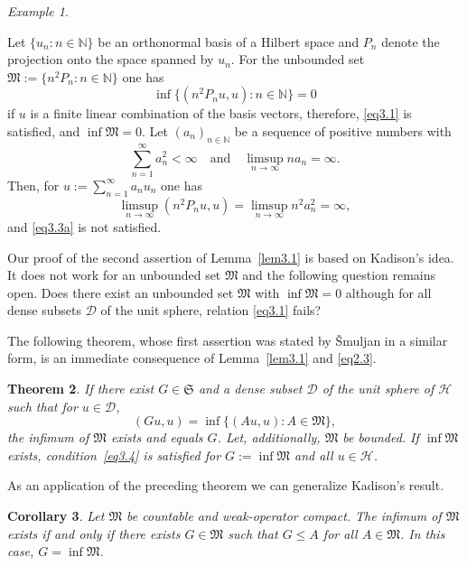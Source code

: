 \documentclass[12pt, a4paper, reqno, twoside]{amsart}
\numberwithin{equation}{section}
\newcommand{\frakS}{\mathfrak S}
\newcommand{\frakM}{\mathfrak M}
\newtheorem{theorem}{Theorem}[section]
\newtheorem{corollary}[theorem]{Corollary}
\theoremstyle{definition}
\theoremstyle{remark}
\newtheorem{example}[theorem]{Example}
\theoremstyle{mystyle}
\begin{document}
\begin{example}
\label{ex3.2}

Let $\{u_{n}: n\in\mathbb N\}$ be an orthonormal basis of a Hilbert
space and $P_{n}$ denote the projection onto the space spanned by
$u_{n}$. For the unbounded set $\frakM:=\{n^{2}P_{n} : n\in\mathbb
N\}$ one has
\[
  \inf\bigl\{(n^{2}P_{n}u,u) : n\in\mathbb N\bigr\}=0
\]
if $u$ is a finite linear combination of the basis vectors, therefore,
\eqref{eq3.1} is satisfied, and $\inf\frakM=0$. Let
$(a_{n})_{n\in\mathbb N}$  be a sequence of positive numbers with
\[
 \sum_{n=1}^{\infty}a_{n}^{2}<\infty \quad\text{and}\quad
 \limsup_{n\to\infty} na_{n} =\infty. 
\]
Then, for $u:=\sum_{n=1}^{\infty}a_{n}u_{n}$ one has
\[
\limsup_{n\to\infty}(n^{2} P_{n}u,u)=
\limsup_{n\to\infty}n^{2}a_{n}^{2} = \infty,
\]
and \eqref{eq3.3a} is not satisfied.
\end{example}

Our proof of the second assertion of Lemma~\ref{lem3.1} is based on
Kadison's idea. It does not work for an unbounded set $\frakM$ and the
following question remains open. Does there exist an unbounded set
$\frakM$ with $\inf\frakM=0$ although for all dense subsets $\mathscr
D$ of the unit sphere, relation \eqref{eq3.1} fails?

The following theorem, whose first assertion was stated by
{\v S}mul{\cprime}jan \cite[Thm. 1.2]{Shmulyan1959} in a similar form,
is an immediate consequence of Lemma~\ref{lem3.1} and \eqref{eq2.3}.

\begin{theorem}
  \label{thm3.3}
If there exist $G\in\frakS$ and a dense subset $\mathscr D$ of the
unit sphere of $\mathscr H$ such that for $u\in\mathscr D$,
\begin{equation}
  \label{eq3.4}
  (Gu,u)=\inf\bigl\{(Au,u) : A\in\frakM\bigr\},
\end{equation}
the infimum of $\frakM$ exists and equals $G$. Let, additionally,
$\frakM$ be bounded. If $\inf\frakM$ exists, condition~\eqref{eq3.4} is
satisfied for $G:=\inf\frakM$ and all $u\in\mathscr H$.
\end{theorem}

As an application of the preceding theorem we can generalize
Kadison's result.

\begin{corollary}
\label{cor3.4}
Let $\frakM$ be countable and weak-operator compact. The infimum of
$\frakM$ exists if and only if there exists $G\in\frakM$ such that
$G\leq A$ for all $A\in\frakM$. In this case, $G=\inf\frakM$.
\end{corollary}
\end{document}
